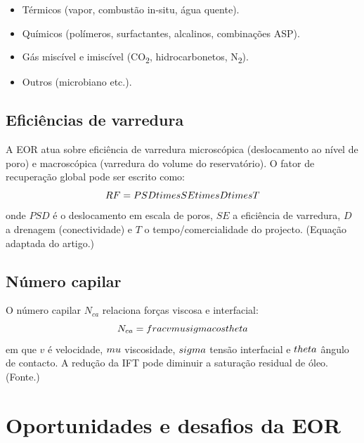 \documentclass[11pt,a4paper]{article}
\begin{document}
\begin{itemize}[noitemsep]
  \item Térmicos (vapor, combustão in-situ, água quente).
  \item Químicos (polímeros, surfactantes, alcalinos, combinações ASP).
  \item Gás miscível e imiscível (CO\textsubscript{2}, hidrocarbonetos, N\textsubscript{2}).
  \item Outros (microbiano etc.).
\end{itemize}

\subsection{Eficiências de varredura}
A EOR atua sobre eficiência de varredura microscópica (deslocamento ao nível de poro) e macroscópica (varredura do volume do reservatório). O fator de recuperação global pode ser escrito como:
\begin{equation}
RF = PSD \\times SE \\times D \\times T
\end{equation}
onde $PSD$ é o deslocamento em escala de poros, $SE$ a eficiência de varredura, $D$ a drenagem (conectividade) e $T$ o tempo/comercialidade do projecto. (Equação adaptada do artigo.)

\subsection{Número capilar}
O número capilar $N_{ca}$ relaciona forças viscosa e interfacial:
\begin{equation}
N_{ca} = \\frac{v \\mu}{\\sigma \\cos\\theta}
\end{equation}
em que $v$ é velocidade, $\\mu$ viscosidade, $\\sigma$ tensão interfacial e $\\theta$ ângulo de contacto. A redução da IFT pode diminuir a saturação residual de óleo. (Fonte.)

\section{Oportunidades e desafios da EOR}
\end{document}
